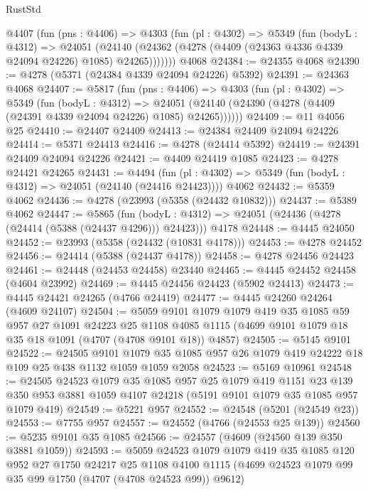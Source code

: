 \begin{lexlean}{RustStd}
\begin{coremodule}
    @4407
      (fun (pns : @4406) =>
      @4303
        (fun (pl : @4302) =>
        @5349
          (fun (bodyL : @4312) =>
          @24051
            (@24140 (@24362 (@4278 (@4409 (@24363 @4336 @4339 @24094 @24226) @1085) @24265)))))))
    @4068
@24384 := @24355 @4068
@24390 := @4278 (@5371 (@24384 @4339 @24094 @24226) @5392)
@24391 := @24363 @4068
@24407 := @5817
    (fun (pns : @4406) =>
    @4303
      (fun (pl : @4302) =>
      @5349
        (fun (bodyL : @4312) =>
        @24051 (@24140 (@24390 (@4278 (@4409 (@24391 @4339 @24094 @24226) @1085) @24265))))))
@24409 := @11 @4056 @25
@24410 := @24407 @24409
@24413 := @24384 @24409 @24094 @24226
@24414 := @5371 @24413
@24416 := @4278 (@24414 @5392)
@24419 := @24391 @24409 @24094 @24226
@24421 := @4409 @24419 @1085
@24423 := @4278 @24421 @24265
@24431 := @4494
    (fun (pl : @4302) => @5349 (fun (bodyL : @4312) => @24051 (@24140 (@24416 @24423))))
    @4062
@24432 := @5359 @4062
@24436 := @4278 (@23993 (@5358 (@24432 @10832)))
@24437 := @5389 @4062
@24447 := @5865
    (fun (bodyL : @4312) => @24051 (@24436 (@4278 (@24414 (@5388 (@24437 @4296))) @24423)))
    @4178
@24448 := @4445 @24050
@24452 := @23993 (@5358 (@24432 (@10831 @4178)))
@24453 := @4278 @24452
@24456 := @24414 (@5388 (@24437 @4178))
@24458 := @4278 @24456 @24423
@24461 := @24448 (@24453 @24458) @23440
@24465 := @4445 @24452 @24458 (@4604 @23992)
@24469 := @4445 @24456 @24423 (@5902 @24413)
@24473 := @4445 @24421 @24265 (@4766 @24419)
@24477 := @4445 @24260 @24264 (@4609 @24107)
@24504 := @5059
    @9101
    @1079
    @1079
    @419
    @35
    @1085
    @59
    @957
    @27
    @1091
    @24223
    @25
    @1108
    @4085
    @1115
    (@4699 @9101 @1079 @18 @35 @18 @1091 (@4707 (@4708 @9101 @18)) @4857)
@24505 := @5145 @9101
@24522 := @24505
    @9101
    @1079
    @35
    @1085
    @957
    @26
    @1079
    @419
    @24222
    @18
    @109
    @25
    @438
    @1132
    @1059
    @1059
    @2058
@24523 := @5169 @10961
@24548 := @24505
    @24523
    @1079
    @35
    @1085
    @957
    @25
    @1079
    @419
    @1151
    @23
    @139
    @350
    @953
    @3881
    @1059
    @4107
    @24218
    (@5191 @9101 @1079 @35 @1085 @957 @1079 @419)
@24549 := @5221 @957
@24552 := @24548 (@5201 (@24549 @23))
@24553 := @7755 @957
@24557 := @24552 (@4766 (@24553 @25 @139))
@24560 := @5235 @9101 @35 @1085
@24566 := @24557 (@4609 (@24560 @139 @350 @3881 @1059))
@24593 := @5059
    @24523
    @1079
    @1079
    @419
    @35
    @1085
    @120
    @952
    @27
    @1750
    @24217
    @25
    @1108
    @4100
    @1115
    (@4699 @24523 @1079 @99 @35 @99 @1750 (@4707 (@4708 @24523 @99)) @9612)

\end{coremodule}
\end{lexlean}
